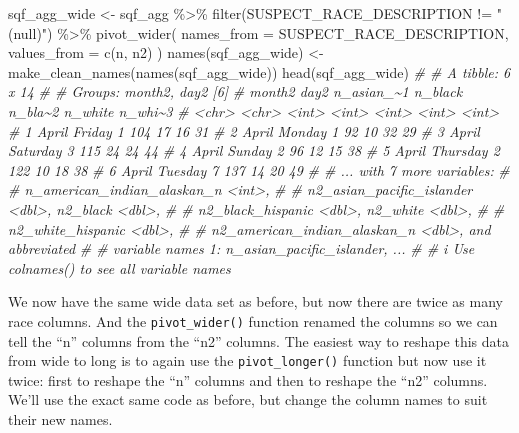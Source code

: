 \documentclass[
  a4paper,
]{krantz}
\makeatletter
\newenvironment{Shaded}{\begin{snugshade}}{\end{snugshade}}
\newcommand{\AttributeTok}[1]{\textcolor[rgb]{0.77,0.63,0.00}{#1}}
\newcommand{\CommentTok}[1]{\textcolor[rgb]{0.56,0.35,0.01}{\textit{#1}}}
\newcommand{\FunctionTok}[1]{\textcolor[rgb]{0.00,0.00,0.00}{#1}}
\newcommand{\NormalTok}[1]{#1}
\newcommand{\OtherTok}[1]{\textcolor[rgb]{0.56,0.35,0.01}{#1}}
\newcommand{\SpecialCharTok}[1]{\textcolor[rgb]{0.00,0.00,0.00}{#1}}
\newcommand{\StringTok}[1]{\textcolor[rgb]{0.31,0.60,0.02}{#1}}
\newenvironment{kframe}{%
\medskip{}
\setlength{\fboxsep}{.8em}
 \def\at@end@of@kframe{}%
 \ifinner\ifhmode%
  \def\at@end@of@kframe{\end{minipage}}%
  \begin{minipage}{\columnwidth}%
 \fi\fi%
 \def\FrameCommand##1{\hskip\@totalleftmargin \hskip-\fboxsep
 \colorbox{shadecolor}{##1}\hskip-\fboxsep
     \hskip-\linewidth \hskip-\@totalleftmargin \hskip\columnwidth}%
 \MakeFramed {\advance\hsize-\width
   \@totalleftmargin\z@ \linewidth\hsize
   \@setminipage}}%
 {\par\unskip\endMakeFramed%
 \at@end@of@kframe}
\renewenvironment{Shaded}{\begin{kframe}}{\end{kframe}}
\makeatother
\begin{document}
\begin{Shaded}
\begin{Highlighting}[]
\NormalTok{sqf\_agg\_wide }\OtherTok{\textless{}{-}}\NormalTok{ sqf\_agg }\SpecialCharTok{\%\textgreater{}\%}
  \FunctionTok{filter}\NormalTok{(SUSPECT\_RACE\_DESCRIPTION }\SpecialCharTok{!=} \StringTok{"(null)"}\NormalTok{) }\SpecialCharTok{\%\textgreater{}\%}
  \FunctionTok{pivot\_wider}\NormalTok{(}
    \AttributeTok{names\_from =}\NormalTok{ SUSPECT\_RACE\_DESCRIPTION,}
    \AttributeTok{values\_from =} \FunctionTok{c}\NormalTok{(n, n2)}
\NormalTok{  )}
\FunctionTok{names}\NormalTok{(sqf\_agg\_wide) }\OtherTok{\textless{}{-}} \FunctionTok{make\_clean\_names}\NormalTok{(}\FunctionTok{names}\NormalTok{(sqf\_agg\_wide))}
\FunctionTok{head}\NormalTok{(sqf\_agg\_wide)}
\CommentTok{\# \# A tibble: 6 x 14}
\CommentTok{\# \# Groups:   month2, day2 [6]}
\CommentTok{\#   month2 day2     n\_asian\_\textasciitilde{}1 n\_black n\_bla\textasciitilde{}2 n\_white n\_whi\textasciitilde{}3}
\CommentTok{\#   \textless{}chr\textgreater{}  \textless{}chr\textgreater{}         \textless{}int\textgreater{}   \textless{}int\textgreater{}   \textless{}int\textgreater{}   \textless{}int\textgreater{}   \textless{}int\textgreater{}}
\CommentTok{\# 1 April  Friday            1     104      17      16      31}
\CommentTok{\# 2 April  Monday            1      92      10      32      29}
\CommentTok{\# 3 April  Saturday          3     115      24      24      44}
\CommentTok{\# 4 April  Sunday            2      96      12      15      38}
\CommentTok{\# 5 April  Thursday          2     122      10      18      38}
\CommentTok{\# 6 April  Tuesday           7     137      14      20      49}
\CommentTok{\# \# ... with 7 more variables:}
\CommentTok{\# \#   n\_american\_indian\_alaskan\_n \textless{}int\textgreater{},}
\CommentTok{\# \#   n2\_asian\_pacific\_islander \textless{}dbl\textgreater{}, n2\_black \textless{}dbl\textgreater{},}
\CommentTok{\# \#   n2\_black\_hispanic \textless{}dbl\textgreater{}, n2\_white \textless{}dbl\textgreater{},}
\CommentTok{\# \#   n2\_white\_hispanic \textless{}dbl\textgreater{},}
\CommentTok{\# \#   n2\_american\_indian\_alaskan\_n \textless{}dbl\textgreater{}, and abbreviated}
\CommentTok{\# \#   variable names 1: n\_asian\_pacific\_islander, ...}
\CommentTok{\# \# i Use \textasciigrave{}colnames()\textasciigrave{} to see all variable names}
\end{Highlighting}
\end{Shaded}

We now have the same wide data set as before, but now there
are twice as many race columns. And the
\texttt{pivot\_wider()} function renamed the columns so we
can tell the ``n'' columns from the ``n2'' columns. The
easiest way to reshape this data from wide to long is to
again use the \texttt{pivot\_longer()} function but now use
it twice: first to reshape the ``n'' columns and then to
reshape the ``n2'' columns. We'll use the exact same code as
before, but change the column names to suit their new names.
\end{document}
